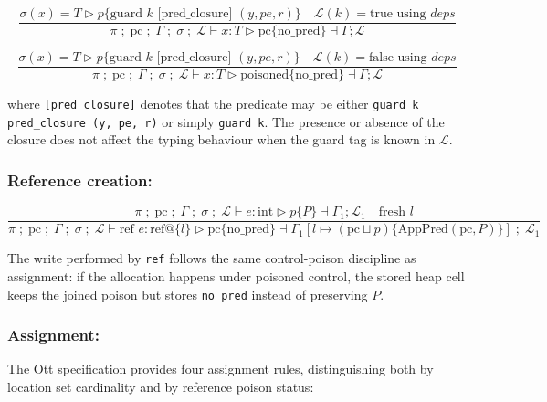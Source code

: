 \documentclass[12pt]{article}
\begin{document}
\[
\frac{\sigma(x) = T \triangleright p \{ \text{guard } k \text{ [pred\_closure] } (y, pe, r) \} \quad \mathcal{L}(k) = \text{true using } deps}{\pi \; ;\; \text{pc} \; ;\; \Gamma \; ;\; \sigma \; ;\; \mathcal{L} \vdash x : T \triangleright \text{pc} \{ \text{no\_pred} \} \dashv \Gamma ; \mathcal{L}}
\]

\[
\frac{\sigma(x) = T \triangleright p \{ \text{guard } k \text{ [pred\_closure] } (y, pe, r) \} \quad \mathcal{L}(k) = \text{false using } deps}{\pi \; ;\; \text{pc} \; ;\; \Gamma \; ;\; \sigma \; ;\; \mathcal{L} \vdash x : T \triangleright \text{poisoned} \{ \text{no\_pred} \} \dashv \Gamma ; \mathcal{L}}
\]

where \texttt{[pred\_closure]} denotes that the predicate may be either \texttt{guard k pred\_closure (y, pe, r)} or simply \texttt{guard k}. The presence or absence of the closure does not affect the typing behaviour when the guard tag is known in $\mathcal{L}$.

\subsubsection*{Reference creation:}
\[
\frac{\pi \; ;\; \text{pc} \; ;\; \Gamma \; ;\; \sigma \; ;\; \mathcal{L} \vdash e : \text{int} \triangleright p \{ P \} \dashv \Gamma_1 ; \mathcal{L}_1 \quad \text{fresh } l}
{\pi \; ;\; \text{pc} \; ;\; \Gamma \; ;\; \sigma \; ;\; \mathcal{L} \vdash \text{ref } e : \text{ref} @ \{l\} \triangleright \text{pc} \{ \text{no\_pred} \} \dashv \Gamma_1[l \mapsto (\text{pc} \sqcup p) \{ \mathrm{AppPred}(\text{pc}, P) \}] \; ;\; \mathcal{L}_1}
\]

The write performed by \texttt{ref} follows the same control-poison discipline as
assignment: if the allocation happens under poisoned control, the stored heap cell
keeps the joined poison but stores \texttt{no\_pred} instead of preserving $P$.

\subsubsection*{Assignment:}
The Ott specification provides four assignment rules, distinguishing both by location
set cardinality and by reference poison status:
\end{document}
